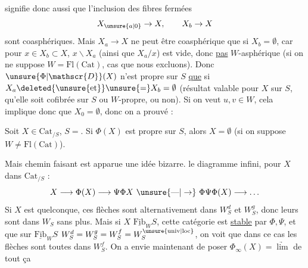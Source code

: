 
signifie donc aussi que l'inclusion des fibres fermées
\[
X_{\unsure{a|0}}\to X,\qquad X_b\to X
\]
sont coasphériques. Mais $X_a\to X$ ne peut être coasphérique que si $X_b=\emptyset$, car pour $x\in X_b\subset X$, $x\backslash X_a$ (ainsi que $X_a/x$) est vide, donc \uline{pas} $W$-asphérique (si on ne suppose $W=\mathrm{Fl}(\mathrm{Cat})$, cas que nous excluons). Donc $\unsure{\Phi|\mathscr{D}}(X)$ n'est propre sur $S$ \uline{que} si $X_a\deleted{\unsure{\text{et}}}\unsure{=}X_b=\emptyset$ (résultat valable pour \uline{} $X$ sur $S$, qu'elle soit cofibrée sur $S$ ou $W$-propre, ou non). Si on veut $u,v\in W$, cela implique donc que $X_0=\emptyset$, donc on a prouvé :

\margin{$\vert\!\Vert$}
Soit $X\in\mathrm{Cat}_{/S}$, $S={}$. Si $\Phi(X)$ est propre
sur $S$, alors $X=\emptyset$ (si on suppose $W\ne\mathrm{Fl}(\mathrm{Cat})$).

Mais chemin faisant est apparue une idée bizarre.  le  diagramme infini, pour $X$ dans $\mathrm{Cat}_{/S}$  :
\[
X\longrightarrow\Phi(X)\longrightarrow\Psi\Phi X\ \unsure{\text{---}|\to}\ \Phi\Psi\Phi(X)\longrightarrow\ldots
\]
Si $X$ est quelconque, ces flèches sont alternativement dans $W_S^d$ et $W_S^g$, donc leurs  sont dans $W_S$ sans plus. Mais si $X$   $\underline{\mathrm{Fib}}_W S$,   cette catégorie est \uline{stable} par $\Phi,\Psi$, et que sur $\underline{\mathrm{Fib}}_W S$ $W_S^d=W_S^g=W_S^f=W_S^{\unsure{\mathrm{univ}|\mathrm{loc}}}$, on voit que dans ce cas les flèches sont toutes dans $W_S^f$.  On a envie maintenant de poser $\Phi_\infty(X)=\underrightarrow{\lim}$ de tout ça
